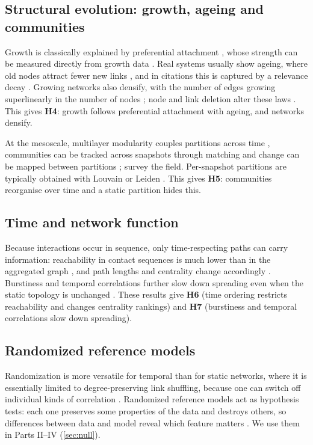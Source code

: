 \subsection{Structural evolution: growth, ageing and communities}
\label{sec:rw-evolution}
Growth is classically explained by preferential attachment
\citep{barabasi1999emergence}, whose strength can be measured directly from
growth data \citep{jeong2003measuring,newman2001clustering}. Real systems usually
show ageing, where old nodes attract fewer new links
\citep{dorogovtsev2000aging}, and in citations this is captured by a relevance
decay \citep{wang2013quantifying}. Growing networks also densify, with the number of
edges growing superlinearly in the number of nodes
\citep{leskovec2005graphs,leskovec2007graph}; node and link deletion alter these
laws \citep{moore2006exact}. This gives \textbf{H4}: growth follows preferential
attachment with ageing, and networks densify.

At the mesoscale, multilayer modularity couples partitions across time
\citep{mucha2010community}, communities can be tracked across snapshots through
matching \citep{greene2010tracking} and change can be mapped between partitions
\citep{rosvall2010mapping}; \citet{rossetti2018community} survey the field. Per-snapshot
partitions are typically obtained with Louvain \citep{blondel2008fast} or Leiden
\citep{traag2019louvain}. This gives \textbf{H5}: communities reorganise over time and
a static partition hides this.

\subsection{Time and network function}
\label{sec:rw-function}
Because interactions occur in sequence, only time-respecting paths can carry
information: reachability in contact sequences is much lower than in the aggregated
graph \citep{holme2005network}, and path lengths and centrality change accordingly
\citep{pan2011path,kim2012temporal}. Burstiness and temporal correlations further
slow down spreading even when the static topology is unchanged
\citep{karsai2011small}. These results give \textbf{H6} (time ordering restricts
reachability and changes centrality rankings) and \textbf{H7} (burstiness and
temporal correlations slow down spreading).

\subsection{Randomized reference models}
\label{sec:rw-null}
Randomization is more versatile for temporal than for static networks, where it is
essentially limited to degree-preserving link shuffling, because one can switch off
individual kinds of correlation \citep{holme2015modern}. Randomized reference models act as hypothesis tests: each one preserves some
properties of the data and destroys others, so differences between data and model
reveal which feature matters \citep{gauvin2022randomized}. We use them in Parts
II--IV (\cref{sec:null}).

